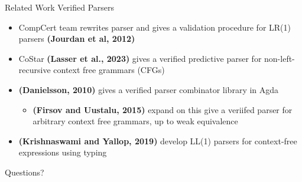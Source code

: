 \documentclass[10pt]{beamer}
\begin{document}
\begin{frame}{Related Work}
  Verified Parsers
  \begin{itemize}
    \item CompCert team rewrites parser and gives a validation procedure for LR(1) parsers \textbf{(Jourdan et al, 2012)}
    \item<1-> CoStar \textbf{(Lasser et al., 2023)} gives a verified predictive
          parser for non-left-recursive context free grammars (CFGs)
    \item<2-> \textbf{(Danielsson, 2010)} gives a verified parser combinator library
          in Agda
      \begin{itemize}
        \item<2-> \textbf{(Firsov and Uustalu, 2015)} expand on this give a veriifed parser for arbitrary context free grammars, up to weak equivalence
      \end{itemize}
  \end{itemize}

  \begin{itemize}
    \item<3-> \textbf{(Krishnaswami and Yallop, 2019)} develop LL(1) parsers for context-free expressions using typing
  \end{itemize}
\end{frame}

\begin{frame}[standout]
  Questions?
\end{frame}






\end{document}
